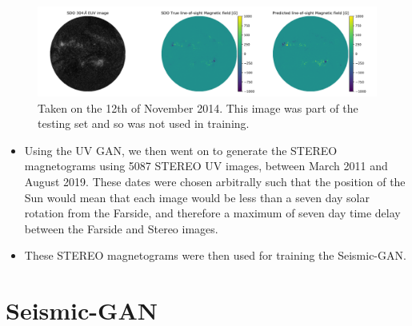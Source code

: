 \documentclass[11pt,a4paper,onecolumn]{report}
\begin{document}
\begin{figure}[t]%
  \includegraphics[width=\linewidth]{aia_hmi_mag.png}
  \caption[]{Taken on the 12th of November 2014. This image was part of the
  testing set and so was not used in training.}
  \label{fig:aia_hmi_mag}
\end{figure}

\begin{itemize}
  \item Using the UV GAN, we then went on to generate the STEREO magnetograms
  using 5087 STEREO UV images, between March 2011 and August 2019. These dates
  were chosen arbitrally such that the position of the Sun would mean that each
  image would be less than a seven day solar rotation from the Farside, and
  therefore a maximum of seven day time delay between the Farside and Stereo
  images.
  \item These STEREO magnetograms were then used for training the Seismic-GAN.
\end{itemize}


\section{Seismic-GAN}
\end{document}
